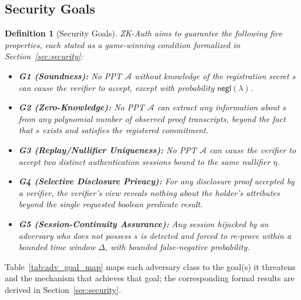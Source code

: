 \documentclass[journal,twoside,10pt]{IEEEtran}
\newtheorem{definition}{Definition}
\begin{document}
\subsection{Security Goals}
\label{sec:secgoals}
\begin{definition}[Security Goals]
\label{def:goals}
ZK-Auth aims to guarantee the following five properties, each stated as a
game-winning condition formalized in Section~\ref{sec:security}:
\begin{itemize}
  \item \textbf{G1 (Soundness):} No PPT $\mathcal{A}$ without knowledge of
        the registration secret $s$ can cause the verifier to accept,
        except with probability $\mathsf{negl}(\lambda)$.
  \item \textbf{G2 (Zero-Knowledge):} No PPT $\mathcal{A}$ can extract any
        information about $s$ from any polynomial number of observed
        proof transcripts, beyond the fact that $s$ exists and satisfies
        the registered commitment.
  \item \textbf{G3 (Replay/Nullifier Uniqueness):} No PPT $\mathcal{A}$
        can cause the verifier to accept two distinct authentication
        sessions bound to the same nullifier $\eta$.
  \item \textbf{G4 (Selective Disclosure Privacy):} For any disclosure
        proof accepted by a verifier, the verifier's view reveals nothing
        about the holder's attributes beyond the single requested
        boolean predicate result.
  \item \textbf{G5 (Session-Continuity Assurance):} Any session hijacked
        by an adversary who does not possess $s$ is detected and forced
        to re-prove within a bounded time window $\Delta$, with bounded
        false-negative probability.
\end{itemize}
\end{definition}

Table~\ref{tab:adv_goal_map} maps each adversary class to the goal(s) it
threatens and the mechanism that achieves that goal; the corresponding
formal results are derived in Section~\ref{sec:security}.
\end{document}
